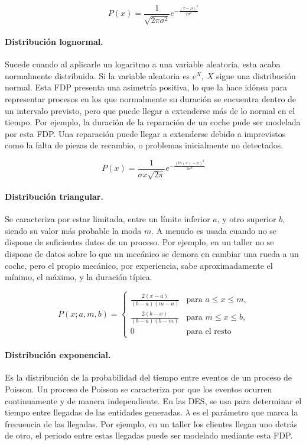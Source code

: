 \begin{equation}
	P(x) = \frac{1}{\sqrt{2 \pi \sigma ^{2}}} e^{-\frac{(x-\mu)^{2}}{2\sigma ^{2}}}
\end{equation}

\paragraph{Distribución lognormal.} Sucede cuando al aplicarle
un logaritmo a una variable aleatoria,
esta acaba normalmente distribuida.
Si la variable aleatoria es $e^X$, $X$
sigue una distribución normal.
Esta FDP presenta una asimetría positiva,
lo que la hace idónea para representar procesos
en los que normalmente su duración se encuentra
dentro de un intervalo previsto,
pero que puede llegar a extenderse más de lo normal en el tiempo.
Por ejemplo, la duración de la reparación de un coche
pude ser modelada por esta FDP.
Una reparación puede llegar a extenderse debido a
imprevistos como la falta de piezas de recambio,
o problemas inicialmente no detectados.

\begin{equation}
	P(x) = \frac{1}{\sigma x \sqrt{2 \pi}} e^{-\frac{(ln(x)-\mu)^{2}}{2\sigma ^{2}}}
\end{equation}

\paragraph{Distribución triangular.} Se caracteriza por estar limitada,
entre un límite inferior $a$, y otro superior $b$,
siendo su valor más probable la moda $m$.
A menudo es usada cuando no se dispone de
suficientes datos de un proceso.
Por ejemplo, en un taller no se dispone de datos sobre
lo que un mecánico se demora en cambiar una rueda a un coche,
pero el propio mecánico, por experiencia,
sabe aproximadamente el mínimo, el máximo, y la duración típica. 

\begin{equation}
	P(x;a,m,b) =
	\begin{cases}
		\frac{2(x-a)}{(b-a)(m-a)}	&\text{para $a\leq x\leq m$,} \\
		\frac{2(b-x)}{(b-a)(b-m)}	&\text{para $m\leq x\leq b$,} \\
		0							&\text{para el resto}
	\end{cases}
\end{equation}

\paragraph{Distribución exponencial.} Es la distribución
de la probabilidad del tiempo entre eventos de un proceso de Poisson.
Un proceso de Poisson se caracteriza por que los eventos
ocurren continuamente y de manera independiente.
En las DES, se usa para determinar el tiempo entre llegadas
de las entidades generadas.
$\lambda$ es el parámetro que marca la frecuencia de las llegadas.
Por ejemplo, en un taller los clientes llegan uno detrás de otro,
el periodo entre estas llegadas puede ser modelado mediante esta FDP.

